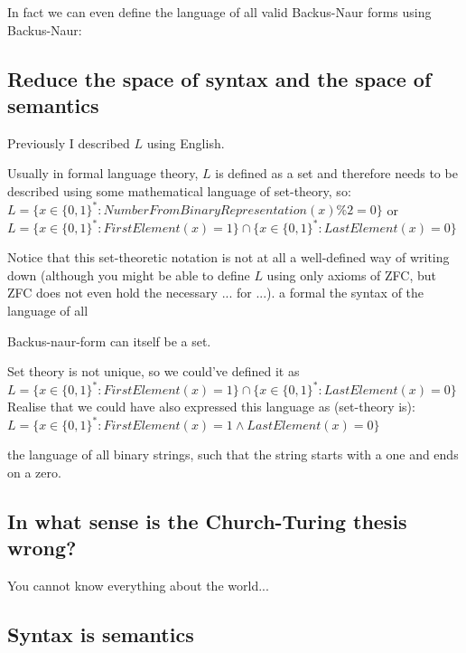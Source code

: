 In fact we can even define the language of all valid Backus-Naur forms using Backus-Naur:


\subsection{Reduce the space of syntax and the space of semantics}


Previously I described $L$ using English. 



Usually in formal language theory, $L$ is defined as a set and therefore needs to be described using some mathematical language of set-theory, so:
$L = \{x \in \{0,1\}^* : NumberFromBinaryRepresentation(x) \% 2 = 0\}$ or
$L = \{x \in \{0,1\}^* : FirstElement(x)=1\} \cap \{x \in \{0,1\}^* : LastElement(x)=0\}$




Notice that this set-theoretic notation is not at all a well-defined way of writing down (although you might be able to define $L$ using only axioms of ZFC, but ZFC does not even hold the necessary ... for ...). a  formal the syntax of the language of all 


Backus-naur-form can itself be a set.



Set theory is not unique, so we could've defined it as $L = \{x \in \{0,1\}^* : FirstElement(x)=1\} \cap \{x \in \{0,1\}^* : LastElement(x)=0\}$
Realise that we could have also expressed this language as (set-theory is):
$L = \{x \in \{0,1\}^* : FirstElement(x) = 1 \wedge LastElement(x) = 0\}$

 the language of all binary strings, such that the string starts with a one and ends on a zero.


\subsection{In what sense is the Church-Turing thesis wrong?}
You cannot know everything about the world...


\subsection{Syntax is semantics}




